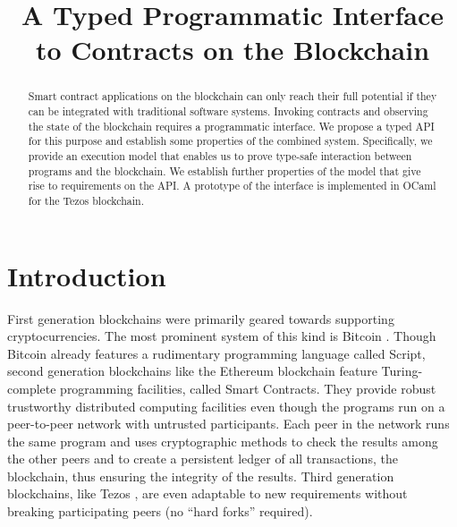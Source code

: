 \documentclass[runningheads]{llncs}
\begin{document}
%
\title{A Typed Programmatic Interface to Contracts on the Blockchain}
%
%

%
\authorrunning{~}
%
%
\maketitle              %
%
\begin{abstract}
  Smart contract applications on the blockchain can only reach their full potential if
  they can be integrated with traditional software systems. Invoking
  contracts and observing the state of the blockchain requires a
  programmatic interface. We propose a typed API for this
  purpose and establish some properties of the combined
  system. Specifically, we provide an execution model that
  enables us to prove type-safe interaction between programs and the 
  blockchain. We establish further properties of the model that
  give rise to requirements on the API. A prototype of the interface
  is implemented in OCaml for the Tezos blockchain.
\end{abstract}

%
%
%
\section{Introduction}
\label{sec:introduction}
First generation blockchains were primarily geared towards supporting
cryptocurrencies. The most prominent system of this kind is Bitcoin
\cite{bitcoin-whitepaper}. Though Bitcoin already features a
rudimentary programming language called Script, second generation
blockchains like the Ethereum blockchain \cite{eth-whitepaper} feature
Turing-complete programming facilities, called 
Smart Contracts. They provide robust trustworthy distributed computing
facilities even though the programs run on a peer-to-peer network with
untrusted participants. Each peer in the network runs the same program
and uses cryptographic methods to check the results among the other
peers and to create a persistent ledger of all transactions, the
blockchain, thus ensuring the integrity of the results. Third
generation blockchains, like Tezos \cite{tezos-whitepaper}, are even adaptable to
new requirements without breaking participating peers (no ``hard
forks'' required).
\end{document}
